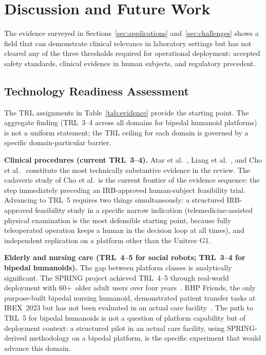 \documentclass[acmsmall]{acmart}
\begin{document}
\section{Discussion and Future Work}
\label{sec:discussion}

The evidence surveyed in Sections~\ref{sec:applications} and~\ref{sec:challenges}
shows a field that can demonstrate clinical relevance in laboratory settings but
has not cleared any of the three thresholds required for operational deployment:
accepted safety standards, clinical evidence in human subjects, and regulatory
precedent.

\subsection{Technology Readiness Assessment}
\label{sec:trl}

The TRL assignments in Table~\ref{tab:evidence} provide the starting point. The
aggregate finding (TRL~3--4 across all domains for bipedal humanoid
platforms) is not a uniform statement; the TRL ceiling for each domain is
governed by a specific domain-particular barrier.

\textbf{Clinical procedures (current TRL~3--4).} Atar et
al.~\cite{atar2025humanoids}, Liang et al.~\cite{liang2025lapsurgie}, and Cho et
al.~\cite{cho2026humanoid} constitute the most technically substantive evidence
in the review. The cadaveric study of Cho et al.\ is the current frontier of the
evidence sequence: the step immediately preceding an IRB-approved human-subject
feasibility trial. Advancing to TRL~5 requires two things simultaneously: a
structured IRB-approved feasibility study in a specific narrow indication
(telemedicine-assisted physical examination is the most defensible starting point,
because fully teleoperated operation keeps a human in the decision loop at all
times), and independent replication on a platform other than the Unitree G1.

\textbf{Elderly and nursing care (TRL~4--5 for social robots; TRL~3--4 for
bipedal humanoids).} The gap between platform classes is analytically significant.
The SPRING project achieved TRL~4--5 through real-world deployment with 60+~older
adult users over four years~\cite{alamedapineda2024spring}. RHP
Friends, the only purpose-built bipedal nursing humanoid, demonstrated patient
transfer tasks at IREX~2023 but has not been evaluated in an actual care
facility~\cite{benallegue2025rhp}. The path to TRL~5 for bipedal humanoids is
not a question of platform capability but of deployment context: a structured
pilot in an actual care facility, using SPRING-derived methodology on a bipedal
platform, is the specific experiment that would advance this domain.
\end{document}
